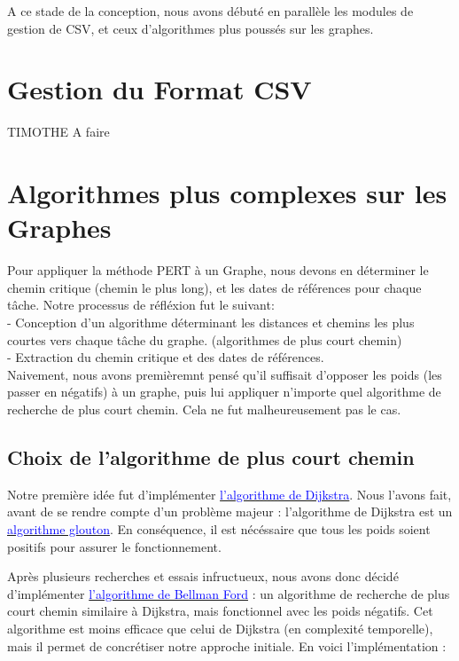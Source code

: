 \documentclass{article}
\begin{document}
A ce stade de la conception, nous avons débuté en parallèle les 
modules de gestion de CSV, et ceux d'algorithmes plus poussés sur les graphes.

\section{Gestion du Format CSV}
TIMOTHE A faire
\section{Algorithmes plus complexes sur les Graphes}
Pour appliquer la méthode PERT à un Graphe, nous devons en déterminer le chemin critique (chemin le plus long),
et les dates de références pour chaque tâche.
Notre processus de réfléxion fut le suivant: \\
- Conception d'un algorithme déterminant les distances et chemins les plus courtes vers chaque tâche du graphe. (algorithmes de plus court chemin) \\
- Extraction du chemin critique et des dates de références. \\


Naivement, nous avons premièremnt pensé qu'il suffisait d'opposer les poids (les passer en négatifs) à un graphe,
puis lui appliquer n'importe quel algorithme de recherche de plus court chemin. Cela ne fut malheureusement pas le cas.
\subsection{Choix de l'algorithme de plus court chemin}
Notre première idée fut d'implémenter \href{https://fr.wikipedia.org/wiki/Algorithme_de_Dijkstra}{\textcolor{blue}{l'algorithme de Dijkstra}}. Nous l'avons fait, avant de se 
rendre compte d'un problème majeur : l'algorithme de Dijkstra est un \href{https://fr.wikipedia.org/wiki/Algorithme_glouton}{\textcolor{blue}{algorithme glouton}}.
En conséquence, il est nécéssaire que tous les poids soient positifs pour assurer le fonctionnement.

Après plusieurs recherches et essais infructueux,
nous avons donc décidé d'implémenter \href{https://fr.wikipedia.org/wiki/Algorithme_de_Bellman-Ford}{\textcolor{blue}{l'algorithme de Bellman Ford}} : un algorithme
de recherche de plus court chemin similaire à Dijkstra, mais fonctionnel avec les poids négatifs.
Cet algorithme est moins efficace que celui de Dijkstra (en complexité temporelle), mais il permet
de concrétiser notre approche initiale.
En voici l'implémentation : 
\end{document}
